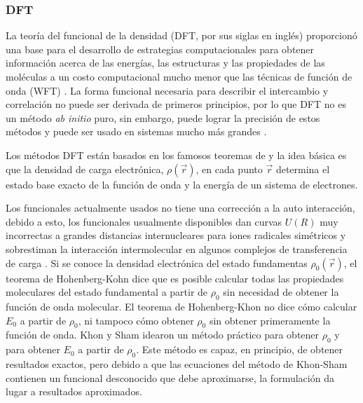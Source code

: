 \subsubsection{DFT}
La teor\'ia del funcional de la densidad (DFT, por sus siglas en 
ingl\'es) proporcion\'o una base para el desarrollo de estrategias
computacionales para obtener informaci\'on  acerca de las energ\'ias,
las estructuras y las propiedades de las mol\'eculas a un costo 
computacional mucho menor que las t\'ecnicas de funci\'on de onda
(WFT) \citep{Geer2003}. La forma funcional necesaria para describir 
el intercambio y correlaci\'on no puede ser derivada de primeros 
principios, por lo que DFT no es un m\'etodo {\it ab initio} puro, 
sin embargo, puede lograr la precisi\'on de estos m\'etodos y 
puede ser usado en sistemas mucho m\'as grandes \citep{Bere2007}.

Los m\'etodos DFT est\'an basados en los famosos teoremas de 
\cite{Hohe1964} y la idea b\'asica es que la densidad de carga
electr\'onica, $\rho(\vec r)$, en cada punto $\vec r$ determina el 
estado base exacto de la funci\'on de onda y la energ\'ia de un 
sistema de electrones.

Los funcionales actualmente usados no tiene una correcci\'on a  la
auto interacci\'on, debido a esto, los funcionales usualmente 
disponibles dan curvas $U(R)$ muy incorrectas a grandes distancias
internucleares para iones radicales sim\'etricos y sobrestiman la 
interacci\'on intermolecular en algunos complejos de transferencia de
carga \citep{Levi2001}. Si se conoce la densidad electr\'onica del
estado fundamentas $\rho_0(\vec r)$, el teorema de Hohenberg-Kohn dice
que es posible calcular todas las propiedades moleculares del estado 
fundamental a partir de $\rho_0$ sin necesidad de obtener la funci\'on
de onda molecular. El teorema de Hohenberg-Khon no dice c\'omo 
calcular $E_0$ a partir de $\rho_0$, ni tampoco c\'omo obtener 
$\rho_0$ sin obtener primeramente la funci\'on de onda.  Khon y Sham
idearon  un m\'etodo pr\'actico para obtener $\rho_0$ y para obtener 
$E_0$ a partir de $\rho_0$. Este m\'etodo es capaz, en principio, de
obtener  resultados exactos, pero debido a que las ecuaciones del 
m\'etodo de Khon-Sham contienen un funcional desconocido que debe 
aproximarse, la formulaci\'on da lugar a resultados aproximados.

